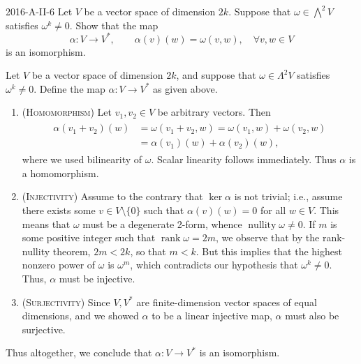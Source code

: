 \documentclass{article}
\begin{document}
	\begin{prb}{2016-A-II-6}
		Let $V$ be a vector space of dimension $2k$. Suppose that $\omega \in \bigwedge^{2}V$ satisfies $\omega^{k} \neq 0$. Show that the map 
		\begin{equation*}
			\alpha: V \to V^{\ast}, \qquad \alpha(v)(w) = \omega(v, w), \quad \forall v, w \in V
		\end{equation*}
		is an isomorphism. 
	\end{prb}
	Let $V$ be a vector space of dimension $2k$, and suppose that $\omega \in \Lambda^2 V$ satisfies $\omega^{k} \neq 0$. Define the map $\alpha: V \to V^{\ast}$ as given above. \vspace{-0.25cm}
	\begin{enumerate}[itemsep =-2pt,label = (\arabic{*})]
		\item (\textsc{Homomorphism}) Let $v_{1}, v_{2} \in V$ be arbitrary vectors. Then 
		\begin{align*}
			\begin{split}
				\alpha(v_{1} + v_{2})(w) &= \omega(v_{1} + v_{2}, w) = \omega(v_{1}, w) + \omega(v_{2}, w) \\
				&= \alpha(v_{1})(w) + \alpha(v_{2})(w), 
			\end{split}
		\end{align*}
		where we used bilinearity of $\omega$. Scalar linearity follows immediately. Thus $\alpha$ is a homomorphism. 
		\item (\textsc{Injectivity}) Assume to the contrary that $\ker{\alpha}$ is not trivial; i.e., assume there exists some $v \in V\setminus \{0\}$ such that $\alpha(v)(w) = 0$ for all $w \in V$. This means that $\omega$ must be a degenerate 2-form, whence $\operatorname{nullity}{\omega} \neq 0$. If $m$ is some positive integer such that $\operatorname{rank}{\omega} = 2m$, we observe that by the rank-nullity theorem, $2m < 2k$, so that $m < k$. But this implies that the highest nonzero power of $\omega$ is $\omega^{m}$, which contradicts our hypothesis that $\omega^{k} \neq 0$. Thus, $\alpha$ must be injective. 
		\item (\textsc{Surjectivity}) Since $V, V^{\ast}$ are finite-dimension vector spaces of equal dimensions, and we showed $\alpha$ to be a linear injective map, $\alpha$ must also be surjective. 
	\end{enumerate}
	Thus altogether, we conclude that $\alpha: V \to V^{\ast}$ is an isomorphism. 
	
\end{document}
